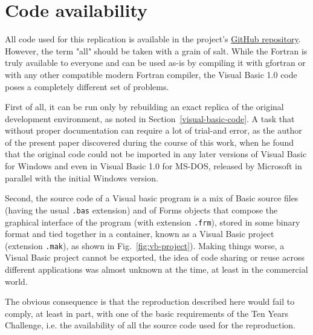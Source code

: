 \section{Code availability}

All code used for this replication is available in the project's \href{https://github.com/sabinomaggi/ten-years-challenge-pulsed-drive}{GitHub repository}.
However, the term "all" should be taken with a grain of salt. While the Fortran is truly available to everyone and can be used as-is by compiling it with gfortran or with any other compatible modern Fortran compiler, the Visual Basic 1.0 code poses a completely different set of problems.

First of all, it can be run only by rebuilding an exact replica of the original development environment, as noted in Section~\ref{visual-basic-code}. A task that without proper documentation can require a lot of trial-and error, as the author of the present paper discovered during the course of this work, when he found that the original code could not be imported in any later versions of Visual Basic for Windows and even in Visual Basic 1.0 for MS-DOS, released by Microsoft in parallel with the initial Windows version.

Second, the source code of a Visual basic program is a mix of Basic source files (having the usual \texttt{.bas} extension) and of Forms objects that compose the graphical interface of the program (with extension \texttt{.frm}), stored in some binary format and tied together in a container, known as a Visual Basic project (extension \texttt{.mak}), as shown in Fig.~\ref{fig:vb-project}).
Making things worse, a Visual Basic project cannot be exported, the idea of code sharing or reuse across different applications was almost unknown at the time, at least in the commercial world.

The obvious consequence is that the reproduction described here would fail to comply, at least in part, with one of the basic requirements of the Ten Years Challenge, i.e. the availability of all the source code used for the reproduction.


